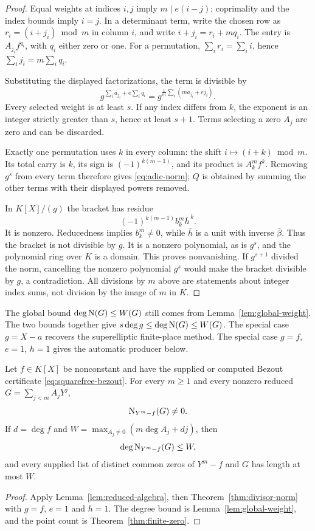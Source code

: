 \begin{proof}
Equal weights at indices $i,j$ imply $m\mid e(i-j)$; coprimality and the index bounds imply $i=j$. In a determinant term, write the chosen row as $r_i=(i+j_i)\bmod m$ in column $i$, and write $i+j_i=r_i+mq_i$. The entry is $A_{j_i}f^{q_i}$, with $q_i$ either zero or one. For a permutation, $\sum_i r_i=\sum_i i$, hence $\sum_i j_i=m\sum_iq_i$.

Substituting the displayed factorizations, the term is divisible by
\[
 g^{\sum_i a_{j_i}+e\sum_iq_i}
       =g^{\frac1m\sum_i(ma_{j_i}+ej_i)}.
\]
Every selected weight is at least $s$. If any index differs from $k$, the exponent is an integer strictly greater than $s$, hence at least $s+1$. Terms selecting a zero $A_j$ are zero and can be discarded.

Exactly one permutation uses $k$ in every column: the shift $i\mapsto(i+k)\bmod m$. Its total carry is $k$, its sign is $(-1)^{k(m-1)}$, and its product is $A_k^mf^k$. Removing $g^s$ from every term therefore gives \eqref{eq:adic-norm}; $Q$ is obtained by summing the other terms with their displayed powers removed.

In $K[X]/(g)$ the bracket has residue
\[
 (-1)^{k(m-1)}b_k^m\bar h^{\,k}.
\]
It is nonzero. Reducedness implies $b_k^m\ne0$, while $\bar h$ is a unit with inverse $\bar\beta$. Thus the bracket is not divisible by $g$. It is a nonzero polynomial, as is $g^s$, and the polynomial ring over $K$ is a domain. This proves nonvanishing. If $g^{s+1}$ divided the norm, cancelling the nonzero polynomial $g^s$ would make the bracket divisible by $g$, a contradiction. All divisions by $m$ above are statements about integer index sums, not division by the image of $m$ in $K$.
\end{proof}

The global bound $\deg\operatorname{N}(G)\le W(G)$ still comes from Lemma~\ref{lem:global-weight}. The two bounds together give $s\deg g\le\deg\operatorname{N}(G)\le W(G)$. The special case $g=X-a$ recovers the superelliptic finite-place method. The special case $g=f$, $e=1$, $h=1$ gives the automatic producer below.

\begin{theorem}\label{thm:squarefree-norm}
Let $f\in K[X]$ be nonconstant and have the supplied or computed Bezout certificate \eqref{eq:squarefree-bezout}. For every $m\ge1$ and every nonzero reduced $G=\sum_{j<m}A_jY^j$,
\[
 \operatorname{N}_{Y^m-f}(G)\ne0.
\]
If $d=\deg f$ and $W=\max_{A_j\ne0}(m\deg A_j+dj)$, then
\[
 \deg\operatorname{N}_{Y^m-f}(G)\le W,
\]
and every supplied list of distinct common zeros of $Y^m-f$ and $G$ has length at most $W$.
\end{theorem}
\begin{proof}
Apply Lemma~\ref{lem:reduced-algebra}, then Theorem~\ref{thm:divisor-norm} with $g=f$, $e=1$ and $h=1$. The degree bound is Lemma~\ref{lem:global-weight}, and the point count is Theorem~\ref{thm:finite-zero}.
\end{proof}

